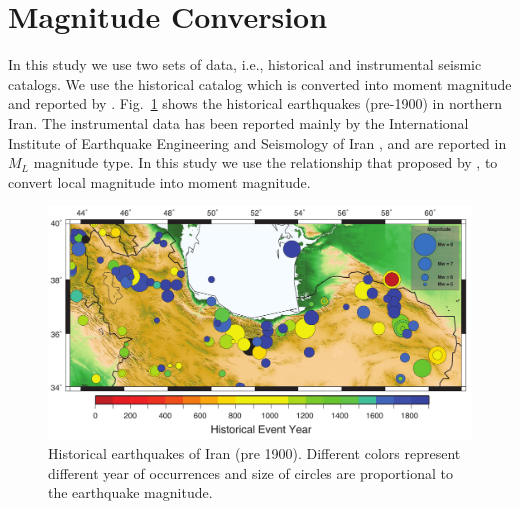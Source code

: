 \section{Magnitude Conversion}

In this study we use two sets of data, i.e., historical and instrumental seismic catalogs. We use the historical catalog which is converted into moment magnitude and reported by \citep{Karimiparidari2013}. Fig.~\ref{fig:historical} shows the historical earthquakes (pre-1900) in northern Iran. The instrumental data has been reported mainly by the International Institute of Earthquake Engineering and Seismology of Iran \citep{IIEES}, and are reported in $M_L$ magnitude type. In this study we use the relationship that proposed by \citet{Karimiparidari2013}, to convert local magnitude into moment magnitude. 

\begin{figure} [H]
\centering
\includegraphics[scale=0.8]{figures/pdf/Figure2.pdf} 
\caption{Historical earthquakes of Iran (pre 1900). Different colors represent different year of occurrences and size of circles are proportional to the earthquake magnitude. }
\label{fig:historical}
\end{figure}
